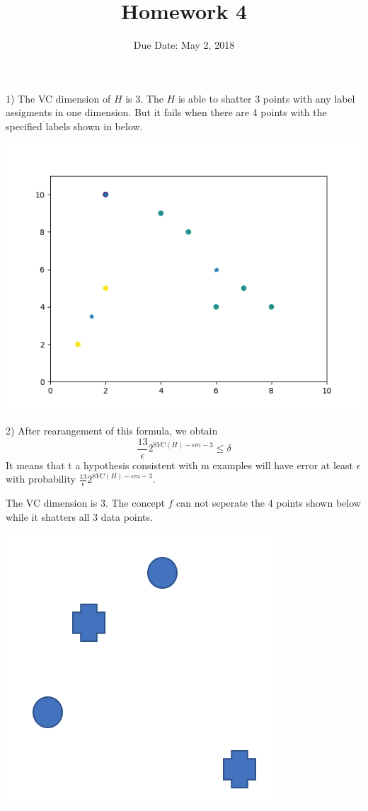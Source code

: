 \documentclass[12pt]{article}
\newenvironment{solution}[2][Solution]{\begin{trivlist}
\item[\hskip \labelsep {\bfseries #1}\hskip \labelsep {\bfseries #2.}]}{\end{trivlist}}
\begin{document}
\title{Homework 4}
\author{Due Date: May 2, 2018}
\date{}

\maketitle

\begin{solution}{1}
1) The VC dimension of $H$ is 3. The $H$ is able to shatter 3 points with any label assigments in one dimension. But it fails when there are 4 points with the specified labels shown in below. \\
\begin{center}
\includegraphics[angle = 0, width = .4\textwidth]{./images/fig6.png}
\end{center}

2) After rearangement of this formula, we obtain
$$
	\frac{13}{\epsilon} 2^{8VC(H)-\epsilon m-3} \leq \delta
$$
It means that t a hypothesis consistent with m examples will have error at least $\epsilon$ with probability $\frac{13}{\epsilon} 2^{8VC(H)-\epsilon m-3}$.

\end{solution}

\begin{solution}{2}
The VC dimension is 3. The concept $f$ can not seperate the 4 points shown below while it shatters all 3 data points.\\
\begin{center}
\includegraphics[angle = 0, width = .4\textwidth]{./images/fig4.png}
\end{center}
\end{solution}
\end{document}
